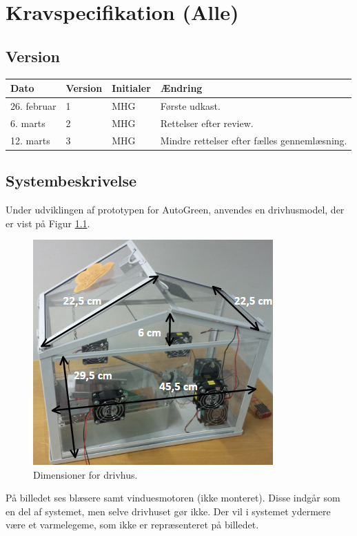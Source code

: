 \chapter{Kravspecifikation (Alle)}

\section{Version}
\begin{table}[h]
	\centering
	\begin{tabularx}{\textwidth - 2cm}{|l|l|l|X|}
	\hline
	Dato	& Version	& Initialer & Ændring	\\ \hline
	26. februar & 1 & MHG & Første udkast. \\ \hline
	6. marts & 2 & MHG & Rettelser efter review. \\ \hline
	12. marts & 3 & MHG & Mindre rettelser efter fælles gennemlæsning. \\\hline
	\end{tabularx}
\end{table}

\section{Systembeskrivelse}
Under udviklingen af prototypen for AutoGreen, anvendes en drivhusmodel, der er vist på Figur \ref{fig:dimensioner}.

\begin{figure}[!h]
\centering 
\includegraphics[scale=0.9] {../fig/dimensioner.png}
\caption{Dimensioner for drivhus.}
\label{fig:dimensioner}
\end{figure}

På billedet ses blæsere samt vinduesmotoren (ikke monteret). Disse indgår som en del af systemet, men selve drivhuset gør ikke. Der vil i systemet ydermere være et varmelegeme, som ikke er repræsenteret på billedet. 

